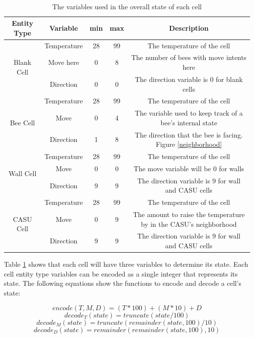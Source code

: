 \documentclass[conference,compsoc,onecolumn]{IEEEtran}
\begin{document}
\begin{center}
	\begin{table}[btp]
		\centering
		\caption{\\The variables used in the overall state of each cell}
		\begin{tabular}{ |c|c|c|c|c|  }
			\hline
			Entity Type & Variable & min & max & Description \\
			\hline
			\hline
			\multirow{3}{4em}{Blank Cell} & Temperature & 28 & 99 & The temperature of the cell \\ 
			& Move here & 0 & 8 & The number of bees with move intents here \\
			& Direction & 0 & 0 & The direction variable is 0 for blank cells \\
			\hline
			\multirow{3}{4em}{Bee Cell} & Temperature & 28 & 99 & The temperature of the cell \\ 
			& Move & 0 & 4 & The variable used to keep track of a bee's internal state \\
			& Direction & 1 & 8 & The direction that the bee is facing. Figure \ref{neighborhood} \\
			\hline
			\multirow{3}{4em}{Wall Cell} & Temperature & 28 & 99 & The temperature of the cell \\ 
			& Move & 0 & 0 & The move variable will be 0 for walls \\
			& Direction & 9 & 9 & The direction variable is 9 for wall and CASU cells \\
			\hline
			\multirow{3}{4em}{CASU Cell} & Temperature & 28 & 99 & The temperature of the cell \\ 
			& Move & 0 & 9 & The amount to raise the temperature by in the CASU's neighborhood \\
			& Direction & 9 & 9 & The direction variable is 9 for wall and CASU cells \\
			\hline
		\end{tabular}
		\label{table:per}
	\end{table}
\end{center}

Table \ref{table:per} shows that each cell will have three variables to determine its state. Each cell entity type variables can be encoded as a single integer that represents its state. The following equations show the functions to encode and decode a cell's state:

\begin{equation}
	encode(T,M,D) = (T * 100) + (M * 10) + D
\end{equation}
\begin{equation}
	decode_T(state) = truncate(state / 100)
\end{equation}
\begin{equation}
	decode_M(state) = truncate(remainder(state,100) / 10)
\end{equation}
\begin{equation}
	decode_D(state) = remainder(remainder(state,100),10)
\end{equation}
\end{document}
